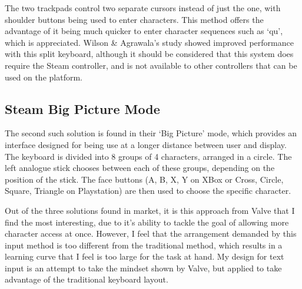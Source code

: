 \documentclass[requirements.tex]{subfiles}
\begin{document}
The two trackpads control two separate cursors instead of just the one, with
shoulder buttons being used to enter characters. This method offers the
advantage of it being much quicker to enter character sequences such as `qu',
which is appreciated. Wilson \& Agrawala's study showed improved performance
with this split keyboard, although it should be considered that this system does
require the Steam controller, and is not available to other controllers that can
be used on the platform.

\subsection{Steam Big Picture Mode} %
\label{sub:steam_big_picture_mode}
The second such solution is found in their `Big Picture' mode, which provides an
interface designed for being use at a longer distance between user and display.
The keyboard is divided into 8 groups of 4 characters, arranged in a circle.
The left analogue stick chooses between each of these groups, depending on the
position of the stick. The face buttons (A, B, X, Y on XBox or Cross, Circle,
Square, Triangle on Playstation) are then used to choose the specific character.

Out of the three solutions found in market, it is this approach from Valve that
I find the most interesting, due to it's ability to tackle the goal of allowing
more character access at once. However, I feel that the arrangement demanded by
this input method is too different from the traditional method, which results
in a learning curve that I feel is too large for the task at hand. My design for
text input is an attempt to take the mindset shown by Valve, but applied to
take advantage of the traditional keyboard layout.
\newpage
\end{document}
